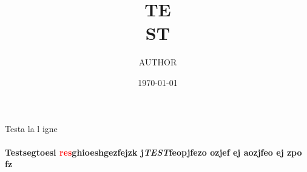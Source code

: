 \documentclass{article}
\author{AUTHOR}
\date{\today}
\begin{document}
Test\newline a la l
igne

\title    {TE\\ST} 
\maketitle


\paragraph{Testsegtoesi
{\textcolor{red}{res}ghio}eshgezfejzk j\emph{TEST}feopjfezo ozjef ej aozjfeo ej zpo fz}
 
\end{document}
